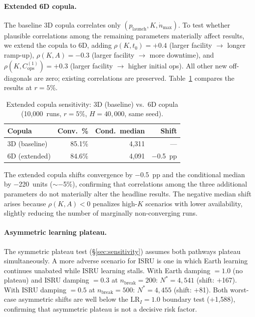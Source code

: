 \documentclass[preprint,12pt]{elsarticle}
\begin{document}
\paragraph{Extended 6D copula.} The baseline 3D copula correlates only $(p_{\mathrm{launch}}, K, \dot{n}_{\max})$. To test whether plausible correlations among the remaining parameters materially affect results, we extend the copula to 6D, adding $\rho(K, t_0) = +0.4$ (larger facility $\to$ longer ramp-up), $\rho(K, A) = -0.3$ (larger facility $\to$ more downtime), and $\rho(K, C_{\mathrm{ops}}^{(1)}) = +0.3$ (larger facility $\to$ higher initial ops). All other new off-diagonals are zero; existing correlations are preserved. Table~\ref{tab:copula_6d} compares the results at $r = 5\%$.

\begin{table}[htbp]
\centering
\caption{Extended copula sensitivity: 3D (baseline) vs.\ 6D copula (10{,}000~runs, $r = 5\%$, $H = 40{,}000$, same seed).}
\label{tab:copula_6d}
\small
\begin{tabular}{@{}lrrr@{}}
\toprule
Copula & Conv.\ \% & Cond.\ median & Shift \\
\midrule
3D (baseline) & 85.1\% & 4{,}311 & --- \\
6D (extended) & 84.6\% & 4{,}091 & $-$0.5~pp \\
\bottomrule
\end{tabular}
\end{table}

The extended copula shifts convergence by $-$0.5~pp and the conditional median by $-$220~units (${\sim}-$5\%), confirming that correlations among the three additional parameters do not materially alter the headline results. The negative median shift arises because $\rho(K, A) < 0$ penalizes high-$K$ scenarios with lower availability, slightly reducing the number of marginally non-converging runs.

\paragraph{Asymmetric learning plateau.} The symmetric plateau test (\S\ref{sec:sensitivity}) assumes both pathways plateau simultaneously. A more adverse scenario for ISRU is one in which Earth learning continues unabated while ISRU learning stalls. With Earth damping $= 1.0$ (no plateau) and ISRU damping $= 0.3$ at $n_{\mathrm{break}} = 200$: $N^* = 4{,}541$ (shift: $+$167). With ISRU damping $= 0.5$ at $n_{\mathrm{break}} = 500$: $N^* = 4{,}455$ (shift: $+$81). Both worst-case asymmetric shifts are well below the $\mathrm{LR}_I = 1.0$ boundary test ($+$1{,}588), confirming that asymmetric plateau is not a decisive risk factor.
\end{document}
